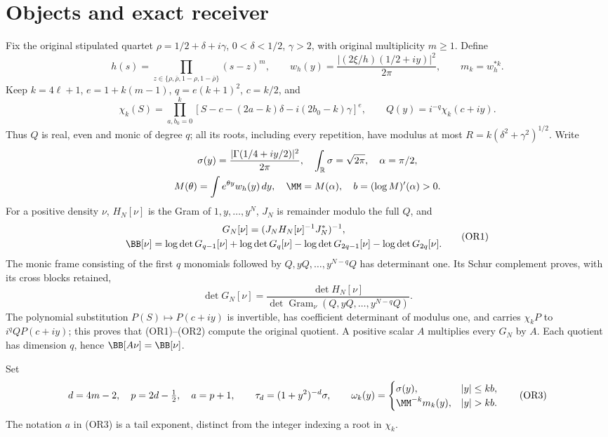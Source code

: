\section{Objects and exact receiver}
Fix the original stipulated quartet
\(\rho=1/2+\delta+i\gamma\), \(0<\delta<1/2\), \(\gamma>2\),
with original multiplicity \(m\geq1\).  Define
\[
 h(s)=\prod_{z\in\{\rho,\bar\rho,1-\rho,1-\bar\rho\}}(s-z)^m,\qquad
 w_h(y)=\frac{|(2\xi/h)(1/2+iy)|^2}{2\pi},\qquad m_k=w_h^{*k}.
\]
Keep \(k=4\ell+1\), \(e=1+k(m-1)\), \(q=e(k+1)^2\), \(c=k/2\), and
\[
 \chi_k(S)=
 \prod_{a,b_0=0}^k
 [S-c-(2a-k)\delta-i(2b_0-k)\gamma]^e,\qquad
 Q(y)=i^{-q}\chi_k(c+iy).
\]
Thus \(Q\) is real, even and monic of degree \(q\); all its roots,
including every repetition, have modulus at most
\(R=k(\delta^2+\gamma^2)^{1/2}\).
Write
\[
\begin{gathered}
 \sigma(y)=\frac{|\Gamma(1/4+iy/2)|^2}{2\pi},\quad
 \int_{\mathbb R}\sigma=\sqrt{2\pi},\quad
 \alpha=\pi/2,\\
 M(\theta)=\int e^{\theta y}w_h(y)\,dy,\quad
 \MM=M(\alpha),\quad b=(\log M)'(\alpha)>0 .
\end{gathered}
\]
For a positive density \(\nu\), \(H_N[\nu]\) is the Gram of
\(1,y,\ldots,y^N\), \(J_N\) is remainder modulo the full \(Q\), and
\[
\begin{gathered}
 G_N[\nu]=(J_NH_N[\nu]^{-1}J_N^*)^{-1},\\
 \BB[\nu]=\log\det G_{q-1}[\nu]+\log\det G_q[\nu]
 -\log\det G_{2q-1}[\nu]-\log\det G_{2q}[\nu].
  \end{gathered}\tag{OR1}
\]
The monic frame consisting of the first \(q\) monomials followed by
\(Q,yQ,\ldots,y^{N-q}Q\) has determinant one.  Its Schur complement
proves, with its cross blocks retained,
\[
 \det G_N[\nu]=\frac{\det H_N[\nu]}
 {\det\operatorname{Gram}_{\nu}(Q,yQ,\ldots,y^{N-q}Q)}. \tag{OR2}
\]
The polynomial substitution \(P(S)\mapsto P(c+iy)\) is invertible, has
coefficient determinant of modulus one, and carries \(\chi_kP\) to
\(i^q QP(c+iy)\); this proves that (OR1)--(OR2) compute the original
quotient.  A positive scalar \(A\) multiplies every \(G_N\) by \(A\).
Each quotient has dimension \(q\), hence \(\BB[A\nu]=\BB[\nu]\).

Set
\[
 d=4m-2,\quad p=2d-\tfrac12,\quad a=p+1,\qquad
 \tau_d=(1+y^2)^{-d}\sigma,\qquad
 \omega_k(y)=
 \begin{cases}\sigma(y),&|y|\leq kb,\\
 \MM^{-k}m_k(y),&|y|>kb.\end{cases}                    \tag{OR3}
\]
The notation \(a\) in (OR3) is a tail exponent, distinct from the
integer indexing a root in \(\chi_k\).

